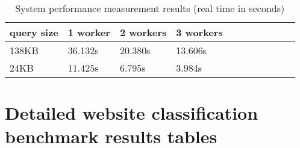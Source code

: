 \documentclass[a4paper]{article}
\begin{document}
\begin{table}[!hbt]
    \caption{ System performance measurement results (real time in seconds)
    \label{table:perf}
    }
\footnotesize
\begin{center}
    \begin{tabular}{|l|l|l|l|l|l|l|l|l|l|l|}
    \hline
        query size & 1 worker & 2 workers & 3 workers\\
    \hline
        138KB & 36.132s&20.380s&13.606s\\
    \hline
        24KB &11.425s&6.795s&3.984s\\
    \hline
    \end{tabular}
\end{center}
\end{table}

\newpage
\appendix
\section{Detailed website classification benchmark results tables}
% 

\end{document}
